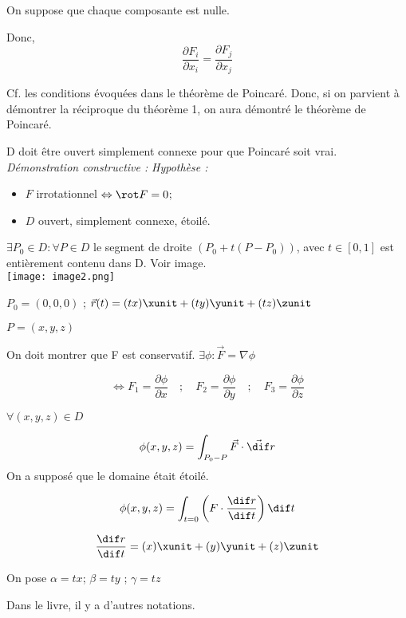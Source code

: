  On suppose que chaque composante est nulle.

 Donc,
 \[\frac{\partial F_i}{\partial x_i}=\frac{\partial F_j}{\partial x_j}\]


Cf. les conditions évoquées dans le théorème de Poincaré. Donc, si on parvient à démontrer la réciproque du théorème 1, on aura démontré le théorème de Poincaré.

D doit être ouvert simplement connexe pour que Poincaré soit vrai.\\




\textit{
Démonstration constructive :}
\textit{
Hypothèse :}

\begin{itemize}
\item $F$ irrotationnel $\Leftrightarrow \rot F =0$;
\item $D$ ouvert, simplement connexe, étoilé.
\end{itemize}

\begin{mydef}

$\exists P_0 \in D : \forall P \in D $ le segment de droite $(P_0+t( P-P_0))$, avec $t\in [0,1]$ est entièrement contenu dans D. Voir image.\\

\texttt{[image: image2.png]}\\
\end{mydef}

$P_0 = (0,0,0)$ ; $\vec r(t) = (tx)\xunit + (ty) \yunit +(tz) \zunit$

$P=(x,y,z)$

On doit montrer que F est conservatif. $\exists \phi : \vec F = \nabla \phi $

\[\Leftrightarrow F_1=\frac{\partial \phi}{\partial x}\quad;\quad F_2=\frac{\partial \phi}{\partial y}\quad;\quad F_3=\frac{\partial \phi}{\partial z}\]

$\forall(x,y,z)\in D$

\[\phi(x,y,z) = \int_{P_0-P} \vec F \cdot \vec \dif r \] On a supposé que le domaine était étoilé.

\[\phi(x,y,z) = \int _{t=0} \left( F\cdot \frac{\dif r}{\dif t}\right) \dif t  \]

\[\frac{\dif r}{\dif t} = (x) \xunit +(y)\yunit +(z) \zunit\]

On pose $\alpha = tx$; $\beta = ty $ ; $\gamma = tz$

Dans le livre, il y a d'autres notations.

